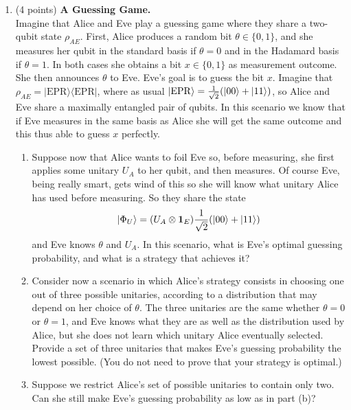 \documentclass[12pt]{article}
\begin{document}
\begin{enumerate}
\item (4 points) \textbf{A Guessing Game.}\\
Imagine that Alice and Eve play a guessing game where they share a two-qubit state \(\rho_{AE}\). First, Alice produces a random bit \(\theta\in\{0,1\}\), and she measures her qubit in the standard basis if \(\theta=0\) and in the Hadamard basis if \(\theta=1\). In both cases she obtains a bit \(x\in\{0,1\}\) as measurement outcome. She then announces \(\theta\) to Eve. Eve's goal is to guess the bit \(x\). Imagine that \(\rho_{AE} = |\mathrm{EPR}\rangle\langle\mathrm{EPR}|\), where as usual $\ket{\mathrm{EPR}} = \frac{1}{\sqrt{2}}(\ket{00}+\ket{11})$, so Alice and Eve share a maximally entangled pair of qubits. In this scenario we know that if Eve measures in the same basis as Alice she will get the same outcome and this thus able to guess \(x\) perfectly.
\begin{enumerate}
\item Suppose now that Alice wants to foil Eve so, before measuring, she first applies some unitary \(U_A\) to her qubit, and then measures. Of course Eve, being really smart, gets wind of this so she will know what unitary Alice has used before measuring. So they share the state\\
\[|\Phi_U\rangle = (U_A\otimes \mathbf{1}_E)\frac{1}{\sqrt{2}}(\ket{00}+ \ket{11})\]
and Eve knows \(\theta\) and \(U_A\). In this scenario, what is Eve's optimal guessing probability, and what is a strategy that achieves it? 
\item Consider now a scenario in which Alice's strategy consists in choosing one out of three possible unitaries, according to a distribution that may depend on her choice of $\theta$. The three unitaries are the same whether $\theta=0$ or $\theta=1$, and Eve knows what they are as well as the distribution used by Alice, but she does not learn which unitary Alice eventually selected. Provide a set of three unitaries that makes Eve's guessing probability the lowest possible. (You do not need to prove that your strategy is optimal.)
\item Suppose we restrict Alice's set of possible unitaries to contain only two. Can she still make Eve's guessing probability as low as in part (b)?
\end{enumerate}




\end{enumerate}
\end{document}
